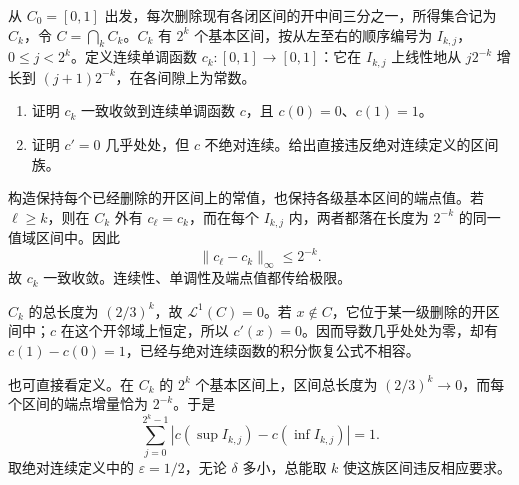 
\begin{exercise}\label{g3:ex:singular-continuous-not-ac}
	从 \(C_0=[0,1]\) 出发，每次删除现有各闭区间的开中间三分之一，所得集合记为 \(C_k\)，令 \(C=\bigcap_kC_k\)。\(C_k\) 有 \(2^k\) 个基本区间，按从左至右的顺序编号为 \(I_{k,j}\)，\(0\le j<2^k\)。定义连续单调函数 \(c_k:[0,1]\to[0,1]\)：它在 \(I_{k,j}\) 上线性地从 \(j2^{-k}\) 增长到 \((j+1)2^{-k}\)，在各间隙上为常数。
	\begin{enumerate}
		\item 证明 \(c_k\) 一致收敛到连续单调函数 \(c\)，且 \(c(0)=0\)、\(c(1)=1\)。
		\item 证明 \(c'=0\) 几乎处处，但 \(c\) 不绝对连续。给出直接违反绝对连续定义的区间族。
	\end{enumerate}
\end{exercise}
\begin{solution}
	构造保持每个已经删除的开区间上的常值，也保持各级基本区间的端点值。若 \(\ell\ge k\)，则在 \(C_k\) 外有 \(c_\ell=c_k\)，而在每个 \(I_{k,j}\) 内，两者都落在长度为 \(2^{-k}\) 的同一值域区间中。因此
	\[
		\|c_\ell-c_k\|_\infty\le2^{-k}.
	\]
	故 \(c_k\) 一致收敛。连续性、单调性及端点值都传给极限。

	\(C_k\) 的总长度为 \((2/3)^k\)，故 \(\mathcal L^1(C)=0\)。若 \(x\notin C\)，它位于某一级删除的开区间中；\(c\) 在这个开邻域上恒定，所以 \(c'(x)=0\)。因而导数几乎处处为零，却有 \(c(1)-c(0)=1\)，已经与绝对连续函数的积分恢复公式不相容。

	也可直接看定义。在 \(C_k\) 的 \(2^k\) 个基本区间上，区间总长度为 \((2/3)^k\to0\)，而每个区间的端点增量恰为 \(2^{-k}\)。于是
	\[
		\sum_{j=0}^{2^k-1}
		|c(\sup I_{k,j})-c(\inf I_{k,j})|=1.
	\]
	取绝对连续定义中的 \(\varepsilon=1/2\)，无论 \(\delta\) 多小，总能取 \(k\) 使这族区间违反相应要求。
\end{solution}

